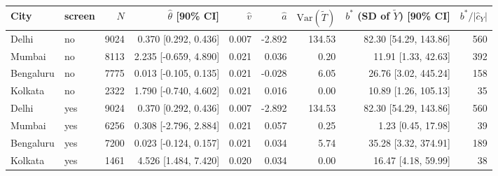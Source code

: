 \begin{tabular}{llrrrrrrr}
\toprule
City & screen & $N$ & $\hat\theta$ [90\% CI] & $\hat v$ & $\hat a$ & $\mathrm{Var}(\tilde T)$ & $b^*$ (SD of $\tilde Y$) [90\% CI] & $b^*/|\hat c_Y|$ \\
\midrule
Delhi & no & 9024 & 0.370 [0.292, 0.436] & 0.007 & -2.892 & 134.53 & 82.30 [54.29, 143.86] & 560 \\
Mumbai & no & 8113 & 2.235 [-0.659, 4.890] & 0.021 & 0.036 & 0.20 & 11.91 [1.33, 42.63] & 392 \\
Bengaluru & no & 7775 & 0.013 [-0.105, 0.135] & 0.021 & -0.028 & 6.05 & 26.76 [3.02, 445.24] & 158 \\
Kolkata & no & 2322 & 1.790 [-0.740, 4.602] & 0.021 & 0.016 & 0.00 & 10.89 [1.26, 105.13] & 35 \\
Delhi & yes & 9024 & 0.370 [0.292, 0.436] & 0.007 & -2.892 & 134.53 & 82.30 [54.29, 143.86] & 560 \\
Mumbai & yes & 6256 & 0.308 [-2.796, 2.884] & 0.021 & 0.057 & 0.25 & 1.23 [0.45, 17.98] & 39 \\
Bengaluru & yes & 7200 & 0.023 [-0.124, 0.157] & 0.021 & 0.034 & 5.74 & 35.28 [3.32, 374.91] & 189 \\
Kolkata & yes & 1461 & 4.526 [1.484, 7.420] & 0.020 & 0.034 & 0.00 & 16.47 [4.18, 59.99] & 38 \\
\bottomrule
\end{tabular}